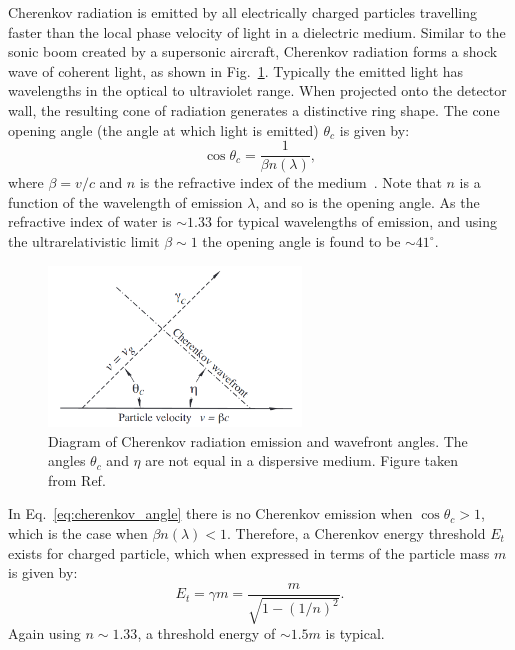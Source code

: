 Cherenkov radiation is emitted by all electrically charged particles travelling faster than the
local phase velocity of light in a dielectric medium. Similar to the sonic boom created by a
supersonic aircraft, Cherenkov radiation forms a shock wave of coherent light, as shown in
Fig.~\ref{fig:cherenkov}. Typically the emitted light has wavelengths in the optical to
ultraviolet range. When projected onto the detector wall, the resulting cone of radiation
generates a distinctive ring shape. The cone opening angle (the angle at which light is emitted)
$\theta_{c}$ is given by:
\begin{equation}
    \cos\theta_{c} = \frac{1}{\beta n(\lambda)},
    \label{eq:cherenkov_angle}
\end{equation}
where $\beta=v/c$ and $n$ is the refractive index of the medium~\cite{particle2020}. Note that $n$
is a function of the wavelength of emission $\lambda$, and so is the opening angle. As the
refractive index of water is $\sim 1.33$ for typical wavelengths of emission, and using the
ultrarelativistic limit $\beta\sim 1$ the opening angle is found to be $\sim41^{\circ}$.

\begin{figure} %
    \includegraphics[width=0.6\textwidth]{diagrams/4-chips/cherenkov.png}
    \caption[Diagram of Cherenkov radiation emission.]
    {Diagram of Cherenkov radiation emission and wavefront angles. The angles $\theta_{c}$ and
        $\eta$ are not equal in a dispersive medium. Figure taken from Ref.~\cite{particle2020}}
    \label{fig:cherenkov}
\end{figure}

In Eq.~\ref{eq:cherenkov_angle} there is no Cherenkov emission when $\cos\theta_{c} > 1$, which is
the case when $\beta n(\lambda)<1$. Therefore, a Cherenkov energy threshold $E_{t}$ exists for
charged particle, which when expressed in terms of the particle mass $m$ is given by:
\begin{equation}
    E_{t} = \gamma m = \frac{m}{\sqrt{1-(1/n)^{2}}}.
    \label{eq:cherenkov_threshold}
\end{equation}
Again using $n\sim 1.33$, a threshold energy of $\sim1.5m$ is typical.

